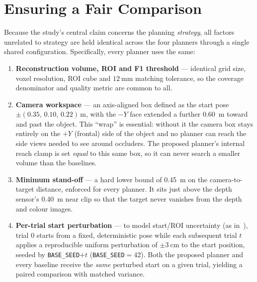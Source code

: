 \section{Ensuring a Fair Comparison}
\label{sec:fair}

Because the study's central claim concerns the planning \emph{strategy}, all
factors unrelated to strategy are held identical across the four planners
through a single shared configuration. Specifically, every planner uses the
same:

\begin{enumerate}
  \item \textbf{Reconstruction volume, ROI and F1 threshold} --- identical
        grid size, voxel resolution, ROI cube and $\SI{12}{\milli\meter}$
        matching tolerance, so the coverage denominator and quality metric
        are common to all.
  \item \textbf{Camera workspace} --- an axis-aligned box defined as the
        start pose $\pm(0.35,\,0.10,\,0.22)$\,m, with the $-Y$ face extended
        a further \SI{0.60}{\meter} toward and past the object. This
        ``wrap'' is essential: without it the camera box stays entirely on
        the $+Y$ (frontal) side of the object and no planner can reach the
        side views needed to see around occluders. The proposed planner's
        internal reach clamp is set \emph{equal} to this same box, so it can
        never search a smaller volume than the baselines.
  \item \textbf{Minimum stand-off} --- a hard lower bound of
        \SI{0.45}{\meter} on the camera-to-target distance, enforced for
        every planner. It sits just above the depth sensor's
        \SI{0.40}{\meter} near clip so that the target never vanishes from
        the depth and colour images.
  \item \textbf{Per-trial start perturbation} --- to model start/ROI
        uncertainty (as in~\cite{burusa2024}), trial $0$ starts from a
        fixed, deterministic pose while each subsequent trial $t$ applies a
        reproducible uniform perturbation of $\pm\SI{3}{\centi\meter}$ to
        the start position, seeded by \texttt{BASE\_SEED}$+t$
        (\texttt{BASE\_SEED}$=42$). Both the proposed planner and every
        baseline receive the \emph{same} perturbed start on a given trial,
        yielding a paired comparison with matched variance.
\end{enumerate}

